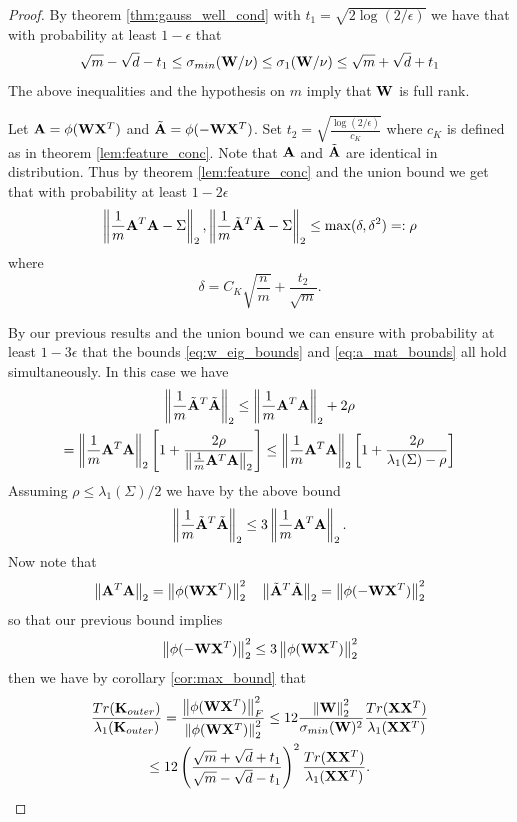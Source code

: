 \begin{proof}
By theorem \ref{thm:gauss_well_cond} with $t_1 = \sqrt{2 \log(2 / \epsilon)}$ we have that with probability at least $1 - \epsilon$ that
\begin{equation}\label{eq:w_eig_bounds}
\sqrt{m} - \sqrt{d} - t_1 \leq \sigma_{min}(\mathbf{W} / \nu) \leq \sigma_{1}(\mathbf{W} / \nu) \leq \sqrt{m} + \sqrt{d} + t_1    
\end{equation}
The above inequalities and the hypothesis on $m$ imply that $\mathbf{W}$ is full rank.
\par
Let $\mathbf{A} = \phi(\mathbf{W} \mathbf{X}^T)$ and $\Tilde{\mathbf{A}} = \phi(-\mathbf{W} \mathbf{X}^T)$.
Set $t_2 = \sqrt{\frac{\log(2/\epsilon)}{c_K}}$ where $c_K$ is defined as in theorem \ref{lem:feature_conc}.  Note that $\mathbf{A}$ and $\Tilde{\mathbf{A}}$ are identical in distribution.  Thus by theorem \ref{lem:feature_conc} and the union bound we get that with probability at least $1 - 2 \epsilon$
\begin{equation}\label{eq:a_mat_bounds}
\left\lVert\frac{1}{m} \mathbf{A}^T \mathbf{A} - \Sigma\right\rVert_2, \left\lVert\frac{1}{m} \Tilde{\mathbf{A}}^T \Tilde{\mathbf{A}} - \Sigma\right\rVert_2  \leq \max(\delta, \delta^2) =: \rho    
\end{equation}
where
\[ \delta = C_K \sqrt{\frac{n}{m}} + \frac{t_2}{\sqrt{m}}. \]
\par
By our previous results and the union bound we can ensure with probability at least $1 - 3 \epsilon$ that the bounds \eqref{eq:w_eig_bounds} and \eqref{eq:a_mat_bounds} all hold simultaneously.  In this case we have
\begin{gather*}
\left\lVert\frac{1}{m} \Tilde{\mathbf{A}}^T \Tilde{\mathbf{A}}\right\rVert_2 \leq \left\lVert\frac{1}{m} \mathbf{A}^T \mathbf{A}\right\rVert_2 + 2\rho \\
= \left\lVert\frac{1}{m} \mathbf{A}^T \mathbf{A}\right\rVert_2 \left[1 + \frac{2\rho}{\left\lVert\frac{1}{m} \mathbf{A}^T \mathbf{A}\right\rVert_2}\right] \leq  \left\lVert\frac{1}{m} \mathbf{A}^T \mathbf{A}\right\rVert_2 \left[1 + \frac{2 \rho}{\lambda_1(\Sigma) - \rho}\right]
\end{gather*}
Assuming $\rho \leq \lambda_1(\Sigma) /2$ we have by the above bound
\[ \left\lVert\frac{1}{m} \Tilde{\mathbf{A}}^T \Tilde{\mathbf{A}}\right\rVert_2 \leq 3 \left\lVert\frac{1}{m} \mathbf{A}^T \mathbf{A}\right\rVert_2. \]
Now note that
\[ \left\lVert\mathbf{A}^T \mathbf{A}\right\rVert_2 = \left\lVert\phi(\mathbf{W} \mathbf{X}^T)\right\rVert_2^2 \quad \left\lVert\Tilde{\mathbf{A}}^T \Tilde{\mathbf{A}}\right\rVert_2 = \left\lVert\phi(-\mathbf{W} \mathbf{X}^T)\right\rVert_2^2  \]
so that our previous bound implies
\[ \left\lVert\phi(-\mathbf{W} \mathbf{X}^T)\right\rVert_2^2 \leq 3 \left\lVert\phi(\mathbf{W} \mathbf{X}^T)\right\rVert_2^2 \]
then we have by corollary \ref{cor:max_bound} that
\begin{gather*}
\frac{Tr(\mathbf{K}_{outer})}{\lambda_1(\mathbf{K}_{outer})} = \frac{\left\lVert\phi(\mathbf{W} \mathbf{X}^T)\right\rVert_F^2}{\left\lVert\phi(\mathbf{W} \mathbf{X}^T)\right\rVert_2^2} 
\leq 12 \frac{\left\lVert\mathbf{W}\right\rVert_2^2}{\sigma_{min}(\mathbf{W})^2} \frac{Tr(\mathbf{X} \mathbf{X}^T)}{\lambda_1(\mathbf{X} \mathbf{X}^T)} \\
\leq 12 \left(\frac{\sqrt{m} + \sqrt{d} + t_1}{\sqrt{m} - \sqrt{d} - t_1}\right)^2  \frac{Tr(\mathbf{X} \mathbf{X}^T)}{\lambda_1(\mathbf{X} \mathbf{X}^T)}.
\end{gather*}
\end{proof}
